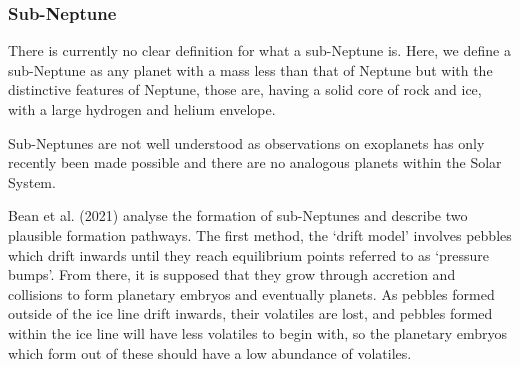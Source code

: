 \documentclass[a4paper,twocolumn,12pt]{article}
\begin{document}


\subsubsection{Sub-Neptune}
\label{subsubsection: Sub-Neptunes}
There is currently no clear definition for what a sub-Neptune is. Here, we define a sub-Neptune as any planet with a mass less than that of Neptune but with the distinctive features of Neptune, those are, having a solid core of rock and ice, with a large hydrogen and helium envelope.

Sub-Neptunes are not well understood as observations on exoplanets has only recently been made possible and there are no analogous planets within the Solar System.


Bean et al. (2021)\cite{NatureAndOriginOfSubNeptunesGoodPaper} analyse the formation of sub-Neptunes and describe two plausible formation pathways. The first method, the `drift model' involves pebbles which drift inwards until they reach equilibrium points referred to as `pressure bumps'. From there, it is supposed that they grow through accretion and collisions to form planetary embryos and eventually planets. As pebbles formed outside of the ice line drift inwards, their volatiles are lost, and pebbles formed within the ice line will have less volatiles to begin with, so the planetary embryos which form out of these should have a low abundance of volatiles.
\end{document}
